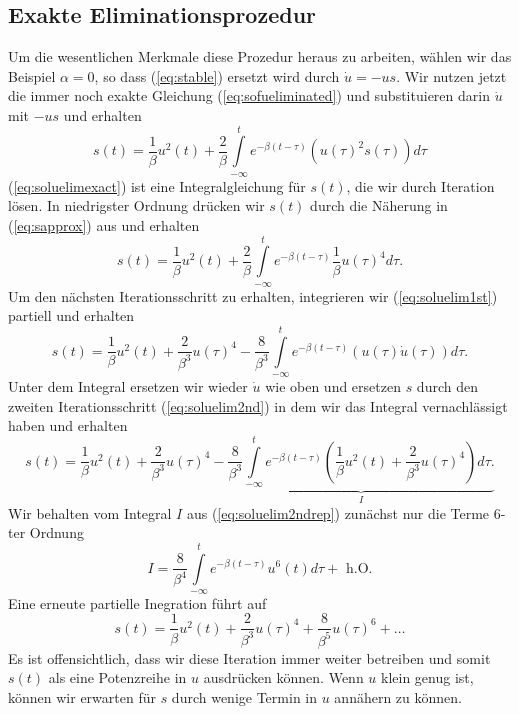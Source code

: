 \subsection{Exakte Eliminationsprozedur}
Um die wesentlichen Merkmale diese Prozedur heraus zu arbeiten, wählen wir das
Beispiel $\alpha=0$, so dass (\ref{eq:stable}) ersetzt wird durch $\dot u=-us$.
Wir nutzen jetzt die immer noch exakte Gleichung (\ref{eq:sofueliminated}) und
substituieren darin $\dot u$ mit $-us$ und erhalten
\begin{equation}
  s(t)=\frac{1}{\beta}u^2(t)+\frac{2}{\beta}\int\limits_{-\infty}^{t}e^{-\beta(t-\tau)}
  (u(\tau)^2 s(\tau))d\tau
  \label{eq:soluelimexact}
\end{equation}
(\ref{eq:soluelimexact}) ist eine Integralgleichung für $s(t)$, die wir durch
Iteration lösen. In niedrigster Ordnung drücken wir $s(t)$ durch die Näherung
in (\ref{eq:sapprox}) aus und erhalten
\begin{equation}
  s(t)=\frac{1}{\beta}u^2(t)+\frac{2}{\beta}\int\limits_{-\infty}^{t}e^{-\beta(t-\tau)}
  \frac{1}{\beta}u(\tau)^4d\tau .
  \label{eq:soluelim1st}
\end{equation}
Um den nächsten Iterationsschritt zu erhalten, integrieren wir
(\ref{eq:soluelim1st}) partiell und erhalten 
\begin{equation}
  s(t)=\frac{1}{\beta}u^2(t)+\frac{2}{\beta^3}u(\tau)^4-
  \frac{8}{\beta^3}\int\limits_{-\infty}^{t}e^{-\beta(t-\tau)}
  (u(\tau)\dot u(\tau))d\tau .
  \label{eq:soluelim2nd}
\end{equation}
Unter dem Integral ersetzen wir wieder $\dot u$ wie oben und ersetzen $s$ durch
den zweiten Iterationsschritt (\ref{eq:soluelim2nd}) in dem wir das Integral
vernachlässigt haben und erhalten
\begin{equation}
  s(t)=\frac{1}{\beta}u^2(t)+\frac{2}{\beta^3}u(\tau)^4-
  \underbrace{
  \frac{8}{\beta^3}\int\limits_{-\infty}^{t}e^{-\beta(t-\tau)}
  \left(\frac{1}{\beta}u^2(t)+\frac{2}{\beta^3}u(\tau)^4\right)d\tau .
  }_{I}
  \label{eq:soluelim2ndrep}
\end{equation}
Wir behalten vom Integral $I$ aus (\ref{eq:soluelim2ndrep}) zunächst nur die
Terme 6-ter Ordnung
\[ 
  I=\frac{8}{\beta^4}\int\limits_{-\infty}^{t}e^{-\beta(t-\tau)}
  u^6(t)d\tau+\text{ h.O.}
\]
Eine erneute partielle Inegration führt auf
\[ 
  s(t)=\frac{1}{\beta}u^2(t)+\frac{2}{\beta^3}u(\tau)^4+\frac{8}{\beta^5}u(\tau)^6+\dots
\]
Es ist offensichtlich, dass wir diese Iteration immer weiter betreiben und
somit $s(t)$ als eine Potenzreihe in $u$ ausdrücken können. Wenn $u$ klein
genug ist, können wir erwarten für $s$ durch wenige Termin in $u$ annähern zu
können.

